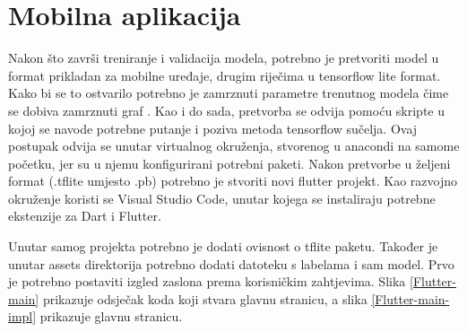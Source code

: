 

\section{Mobilna aplikacija}
Nakon što završi treniranje i validacija modela, potrebno je pretvoriti model u format prikladan za mobilne uređaje, drugim riječima u tensorflow lite format. \newline Kako bi se to ostvarilo potrebno je 
zamrznuti parametre trenutnog modela čime se dobiva zamrznuti graf . Kao i do sada, pretvorba se odvija pomoću skripte u kojoj se navode potrebne putanje i poziva 
metoda tensorflow sučelja. Ovaj postupak odvija se unutar virtualnog okruženja, stvorenog u anacondi na samome početku, jer su u njemu konfigurirani potrebni paketi. Nakon pretvorbe u željeni format (.tflite umjesto .pb) potrebno 
je stvoriti novi flutter projekt. Kao razvojno okruženje koristi se Visual Studio Code, unutar kojega se instaliraju potrebne ekstenzije za Dart i Flutter. 

Unutar samog projekta potrebno je dodati ovisnost  o tflite paketu. Također je unutar assets direktorija potrebno dodati datoteku s labelama i sam model. 
Prvo je potrebno postaviti izgled zaslona prema korisničkim zahtjevima. Slika \ref{Flutter-main} prikazuje odsječak koda koji stvara glavnu stranicu, a slika \ref{Flutter-main-impl} prikazuje glavnu stranicu.


